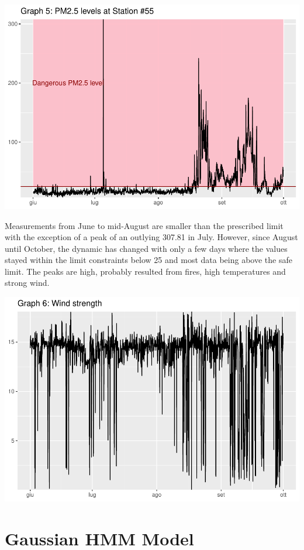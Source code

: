 \documentclass[
]{article}
\begin{document}
\begin{center}\includegraphics[width=0.75\linewidth,height=0.75\textheight]{finalproject_files/figure-latex/PM25 levels-1} \end{center}

Measurements from June to mid-August are smaller than the prescribed
limit with the exception of a peak of an outlying 307.81 in July.
However, since August until October, the dynamic has changed with only a
few days where the values stayed within the limit constraints below 25
and most data being above the safe limit. The peaks are high, probably
resulted from fires, high temperatures and strong wind.

\begin{center}\includegraphics[width=0.75\linewidth,height=0.75\textheight]{finalproject_files/figure-latex/wind levels-1} \end{center}

\hypertarget{gaussian-hmm-model}{%
\section{Gaussian HMM Model}\label{gaussian-hmm-model}}
\end{document}
